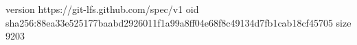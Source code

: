 version https://git-lfs.github.com/spec/v1
oid sha256:88ea33e525177baabd2926011f1a99a8ff04e68f8c49134d7fb1cab18cf45705
size 9203
